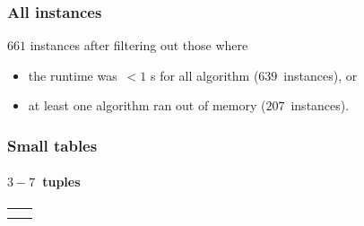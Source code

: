 \documentclass{beamer}
\begin{document}

\begin{frame}
  \frametitle{All instances}
  \centering
  \begin{tikzpicture}[scale=0.5]
      
    \end{tikzpicture} 
    
    \bigskip
    
    \small
    $661$ instances after filtering out those where
    \begin{itemize}
      \item the runtime was~$< 1$ s for all algorithm ($639$~instances), or
      \item at least one algorithm ran out of memory ($207$~instances).
    \end{itemize}

\end{frame}

\begin{frame}
  \frametitle{Small tables}
  \framesubtitle{$3-7$~tuples}
  \begin{tabular}{cc}
      \begin{tikzpicture}[scale=0.5]
        
      \end{tikzpicture} 
    &
    \begin{tikzpicture}[scale=0.5]
      
    \end{tikzpicture} \\
    
    \begin{tikzpicture}[scale=0.5]
      
    \end{tikzpicture} & 
        \begin{tikzpicture}[scale=0.5]
      
    \end{tikzpicture} \\

  \end{tabular}
\end{frame}
\end{document}
